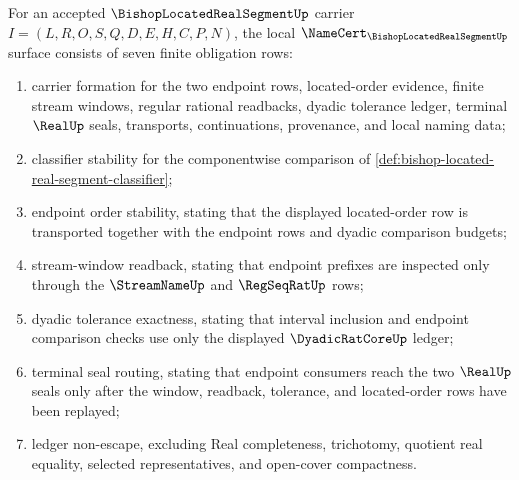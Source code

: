 \begin{theorem}
\label{thm:bishop-located-real-segment-namecert-obligations}
For an accepted $\BishopLocatedRealSegmentUp$ carrier $I=(L,R,O,S,Q,D,E,H,C,P,N)$, the local $\NameCert_{\BishopLocatedRealSegmentUp}$ surface consists of seven finite obligation rows:
\begin{enumerate}
\item carrier formation for the two endpoint rows, located-order evidence, finite stream windows, regular rational readbacks, dyadic tolerance ledger, terminal $\RealUp$ seals, transports, continuations, provenance, and local naming data;
\item classifier stability for the componentwise comparison of \autoref{def:bishop-located-real-segment-classifier};
\item endpoint order stability, stating that the displayed located-order row is transported together with the endpoint rows and dyadic comparison budgets;
\item stream-window readback, stating that endpoint prefixes are inspected only through the $\StreamNameUp$ and $\RegSeqRatUp$ rows;
\item dyadic tolerance exactness, stating that interval inclusion and endpoint comparison checks use only the displayed $\DyadicRatCoreUp$ ledger;
\item terminal seal routing, stating that endpoint consumers reach the two $\RealUp$ seals only after the window, readback, tolerance, and located-order rows have been replayed;
\item ledger non-escape, excluding Real completeness, trichotomy, quotient real equality, selected representatives, and open-cover compactness.
\end{enumerate}
\end{theorem}
